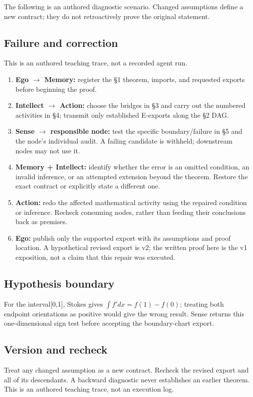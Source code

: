 \documentclass[preprint,12pt,aps,pra,showkeys,amsmath,amssymb,superscriptaddress,floatfix]{revtex4-2}
\theoremstyle{definition}
\theoremstyle{remark}
\providecommand{\tightlist}{\setlength{\itemsep}{2pt}\setlength{\parskip}{0pt}}
\begin{document}
The following is an authored diagnostic scenario. Changed assumptions
define a new contract; they do not retroactively prove the original
statement.

\subsection{Failure and correction}
This is an authored teaching trace, not a recorded agent run.

\begin{enumerate}
\def\labelenumi{\arabic{enumi}.}
\tightlist
\item
  \textbf{Ego \(\to\) Memory:} register the §1 theorem, imports, and
  requested exports before beginning the proof.
\item
  \textbf{Intellect \(\to\) Action:} choose the bridges in §3 and carry
  out the numbered activities in §4; transmit only established E-exports
  along the §2 DAG.
\item
  \textbf{Sense \(\to\) responsible node:} test the specific
  boundary/failure in §5 and the node's individual audit. A failing
  candidate is withheld; downstream nodes may not use it.
\item
  \textbf{Memory + Intellect:} identify whether the error is an omitted
  condition, an invalid inference, or an attempted extension beyond the
  theorem. Restore the exact contract or explicitly state a different
  one.
\item
  \textbf{Action:} redo the affected mathematical activity using the
  repaired condition or inference. Recheck consuming nodes, rather than
  feeding their conclusions back as premises.
\item
  \textbf{Ego:} publish only the supported export with its assumptions
  and proof location. A hypothetical revised export is v2; the written
  proof here is the v1 exposition, not a claim that this repair was
  executed.
\end{enumerate}

\subsection{Hypothesis boundary}
For the interval{[}0,1{]}, Stokes gives \(\int f'dx=f(1)-f(0)\);
treating both endpoint orientations as positive would give the wrong
result. Sense returns this one-dimensional sign test before accepting
the boundary-chart export.

\subsection{Version and recheck}
Treat any changed assumption as a new contract. Recheck the revised
export and all of its descendants. A backward diagnostic never
establishes an earlier theorem. This is an authored teaching trace, not
an execution log.
\end{document}
